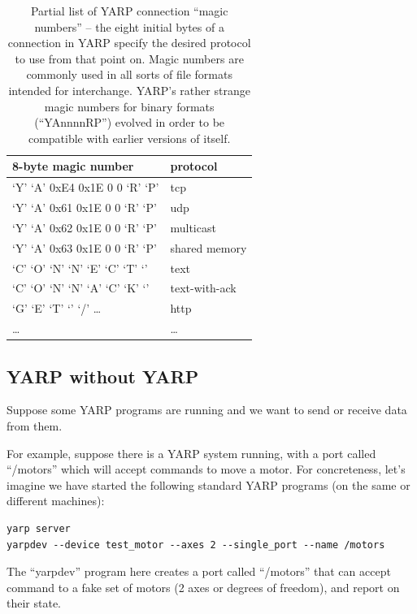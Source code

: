 \begin{table}
\begin{center}
\begin{tabular}{ll}
\hline
\hline
{\bf 8-byte magic number}&{\bf protocol} \\\hline
`Y' `A' 0xE4 0x1E 0 0 `R' `P'&tcp \\
`Y' `A' 0x61 0x1E 0 0 `R' `P'&udp\\
`Y' `A' 0x62 0x1E 0 0 `R' `P'&multicast\\
`Y' `A' 0x63 0x1E 0 0 `R' `P'&shared memory\\
`C' `O' `N' `N' `E' `C' `T' `\textvisiblespace' &text \\
`C' `O' `N' `N' `A' `C' `K' `\textvisiblespace' &text-with-ack \\
`G' `E' `T' `\textvisiblespace' `/' \ldots &http\\
  \ldots & \ldots\\\hline\hline
\end{tabular}
\end{center}
\caption{
%
Partial list of YARP connection ``magic numbers'' -- the eight initial
bytes of a connection in YARP specify the desired protocol to use from
that point on.  Magic numbers are commonly used in all sorts of file
formats intended for interchange.
YARP's rather strange magic numbers for binary formats (``YAnnnnRP'')
evolved in order to be compatible with earlier versions of itself.
%
}
\end{table}


\subsection{YARP without YARP}

Suppose some YARP programs are running and we want to send or
receive data from them.

For example, suppose there is a YARP system running, with a 
port called ``/motors'' which will accept commands to move a
motor.  For concreteness, let's imagine we have started the
following standard YARP programs (on the same or different 
machines):

\begin{verbatim}
yarp server
yarpdev --device test_motor --axes 2 --single_port --name /motors
\end{verbatim}

The ``yarpdev'' program here creates a port called ``/motors'' that can
accept command to a fake set of motors (2 axes or degrees of freedom),
and report on their state.

